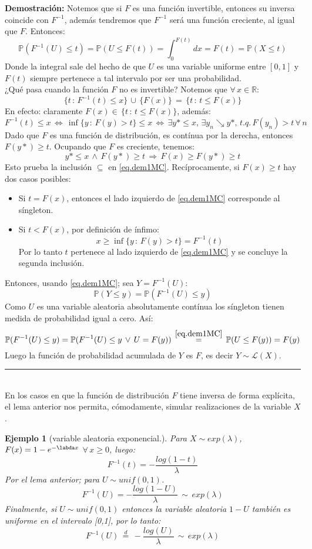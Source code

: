 \documentclass[a4paper]{article}
\newtheorem{ejemplo}{Ejemplo}
\numberwithin{equation}{subsection}
\numberwithin{definicion}{subsection}
\def\R{\mathbb R}
\newcommand{\pb}{\mathbb{P}}
\begin{document}
\textbf{Demostración: }Notemos que si $F$ es una función invertible, entonces su inversa coincide con $F^{-1}$, además tendremos que $F^{-1}$ será una función creciente, al igual que $F$. Entonces:
\[\pb(F^{-1}(U)\leq t) = \pb(U\leq F(t)) = \int_{0}^{F(t)}dx = F(t) = \pb(X\leq t)\]
Donde la integral sale del hecho de que $U$ es una variable uniforme entre $[0,1]$ y $F(t)$ siempre pertenece a tal intervalo por ser una probabilidad.\\ \newline
¿Qué pasa cuando la función $F$ no es invertible? Notemos que $\forall\,x\in\R$:
\begin{equation}
    \{t\,:\,F^{-1}(t)\leq x\}\,\cup\,\{F(x)\}\,=\,\{t\,:\,t\leq F(x)\}
    \label{eq.dem1MC}
\end{equation}
En efecto: claramente $F(x)\in\,\{t\,:\,t\leq F(x)\}$, además:
\[F^{-1}(t)\leq x\,\Longleftrightarrow\,\inf\{y\,:\,F(y)>t\}\leq x\,\Longleftrightarrow\,\exists y*\leq x,\,\exists y_n\searrow y*,\,t.q.\,F(y_n)>t\,\forall\,n\]
Dado que $F$ es una función de distribución, es contínua por la derecha, entonces $F(y*)\geq t$. Ocupando que $F$ es creciente, tenemos:
\[y*\leq x\,\wedge\,F(y*)\geq t\,\Rightarrow\,F(x)\geq F(y*)\geq t\]
Esto prueba la inclusión $\subseteq$ en \ref{eq.dem1MC}. Recíprocamente, si $F(x)\geq t$ hay dos casos posibles:
\begin{itemize}
    \item Si $t=F(x)$, entonces el lado izquierdo de \ref{eq.dem1MC} corresponde al síngleton.
    \item Si $t<F(x)$, por definición de ínfimo:
    \[x\geq \inf\{y\,:\,F(y)>t\} = F^{-1}(t)\]
    Por lo tanto $t$ pertenece al lado izquierdo de \ref{eq.dem1MC} y se concluye la segunda inclusión.
\end{itemize}
Entonces, usando \ref{eq.dem1MC}; sea $Y=F^{-1}(U)$:
\[\pb(Y\leq y) = \pb(F^{-1}(U)\leq y)\]
Como $U$ es una variable aleatoria absolutamente contínua los síngleton tienen medida de probabilidad igual a cero. Así:
\[\pb(F^{-1}(U)\leq y) = \pb(F^{-1}(U)\leq y\,\vee\,U=F(y))\, \overset{\ref{eq.dem1MC}}{=}\,\pb(U\leq F(y)) = F(y)\]
Luego la función de probabilidad acumulada de $Y$ es $F$, es decir $Y\sim \mathcal{L}(X)$. \rule{0.7em}{0.7em}\\ \newline
En los casos en que la función de distribución $F$ tiene inversa de forma explícita, el lema anterior nos permita, cómodamente, simular realizaciones de la variable $X$.

\begin{ejemplo}[variable aleatoria exponencial.] Para $X\sim exp(\lambda)$, $F(x)=1-e^{-\labda x}$ $\forall\,x\geq 0$, luego:
\[F^{-1}(t) = -\frac{log(1-t)}{\lambda}\]
Por el lema anterior; para $U\sim unif(0,1)$.
\[F^{-1}(U) = -\frac{log(1-U)}{\lambda}\,\sim\,exp(\lambda)\]
Finalmente, si $U\sim unif(0,1)$ entonces la variable aleatoria $1-U$ también es uniforme en el intervalo [0,1], por lo tanto:
\[F^{-1}(U)\,\overset{d}{=}\,-\frac{log(U)}{\lambda}\,\sim\,exp(\lambda)\]
\end{ejemplo}
\end{document}
